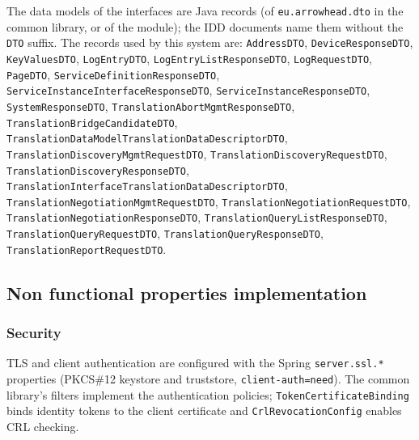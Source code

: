 \documentclass[a4paper]{arrowhead}
\begin{document}
The data models of the interfaces are Java records (of \texttt{eu.arrowhead.dto} in the common library, or of the module); the IDD documents name them without the \texttt{DTO} suffix. The records used by this system are: \texttt{AddressDTO}, \texttt{DeviceResponseDTO}, \texttt{KeyValuesDTO}, \texttt{LogEntryDTO}, \texttt{Log\allowbreak{}Entry\allowbreak{}List\allowbreak{}Response\allowbreak{}DTO}, \texttt{LogRequestDTO}, \texttt{PageDTO}, \texttt{Service\allowbreak{}Definition\allowbreak{}Response\allowbreak{}DTO}, \texttt{Service\allowbreak{}Instance\allowbreak{}Interface\allowbreak{}Response\allowbreak{}DTO}, \texttt{Service\allowbreak{}Instance\allowbreak{}Response\allowbreak{}DTO}, \texttt{SystemResponseDTO}, \texttt{Translation\allowbreak{}Abort\allowbreak{}Mgmt\allowbreak{}Response\allowbreak{}DTO}, \texttt{Translation\allowbreak{}Bridge\allowbreak{}Candidate\allowbreak{}DTO}, \texttt{Translation\allowbreak{}Data\allowbreak{}Model\allowbreak{}Translation\allowbreak{}Data\allowbreak{}Descriptor\allowbreak{}DTO}, \texttt{Translation\allowbreak{}Discovery\allowbreak{}Mgmt\allowbreak{}Request\allowbreak{}DTO}, \texttt{Translation\allowbreak{}Discovery\allowbreak{}Request\allowbreak{}DTO}, \texttt{Translation\allowbreak{}Discovery\allowbreak{}Response\allowbreak{}DTO}, \texttt{Translation\allowbreak{}Interface\allowbreak{}Translation\allowbreak{}Data\allowbreak{}Descriptor\allowbreak{}DTO}, \texttt{Translation\allowbreak{}Negotiation\allowbreak{}Mgmt\allowbreak{}Request\allowbreak{}DTO}, \texttt{Translation\allowbreak{}Negotiation\allowbreak{}Request\allowbreak{}DTO}, \texttt{Translation\allowbreak{}Negotiation\allowbreak{}Response\allowbreak{}DTO}, \texttt{Translation\allowbreak{}Query\allowbreak{}List\allowbreak{}Response\allowbreak{}DTO}, \texttt{Translation\allowbreak{}Query\allowbreak{}Request\allowbreak{}DTO}, \texttt{Translation\allowbreak{}Query\allowbreak{}Response\allowbreak{}DTO}, \texttt{Translation\allowbreak{}Report\allowbreak{}Request\allowbreak{}DTO}.

\subsection{Non functional properties implementation}

\subsubsection{Security}

TLS and client authentication are configured with the Spring \texttt{server.\allowbreak{}ssl.\allowbreak{}*} properties (PKCS\#12 keystore and truststore, \texttt{client-\allowbreak{}auth=\allowbreak{}need}). The common library's filters implement the authentication policies; \texttt{Token\allowbreak{}Certificate\allowbreak{}Binding} binds identity tokens to the client certificate and \texttt{Crl\allowbreak{}Revocation\allowbreak{}Config} enables CRL checking.
\end{document}
